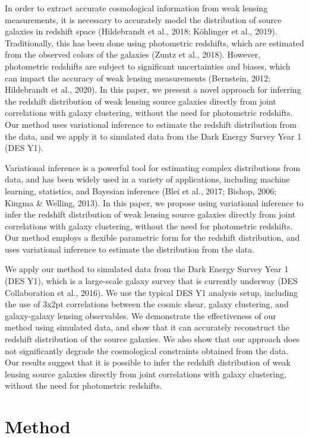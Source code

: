 \documentclass[twocolumn]{aastex631}
\begin{document}
In order to extract accurate cosmological information from weak lensing measurements, it is necessary to accurately model the distribution of source galaxies in redshift space (Hildebrandt et al., 2018; Köhlinger et al., 2019). Traditionally, this has been done using photometric redshifts, which are estimated from the observed colors of the galaxies (Zuntz et al., 2018). However, photometric redshifts are subject to significant uncertainties and biases, which can impact the accuracy of weak lensing measurements (Bernstein, 2012; Hildebrandt et al., 2020). In this paper, we present a novel approach for inferring the redshift distribution of weak lensing source galaxies directly from joint correlations with galaxy clustering, without the need for photometric redshifts. Our method uses variational inference to estimate the redshift distribution from the data, and we apply it to simulated data from the Dark Energy Survey Year 1 (DES Y1).

Variational inference is a powerful tool for estimating complex distributions from data, and has been widely used in a variety of applications, including machine learning, statistics, and Bayesian inference (Blei et al., 2017; Bishop, 2006; Kingma \& Welling, 2013). In this paper, we propose using variational inference to infer the redshift distribution of weak lensing source galaxies directly from joint correlations with galaxy clustering, without the need for photometric redshifts. Our method employs a flexible parametric form for the redshift distribution, and uses variational inference to estimate the distribution from the data.

We apply our method to simulated data from the Dark Energy Survey Year 1 (DES Y1), which is a large-scale galaxy survey that is currently underway (DES Collaboration et al., 2016). We use the typical DES Y1 analysis setup, including the use of 3x2pt correlations between the cosmic shear, galaxy clustering, and galaxy-galaxy lensing observables. We demonstrate the effectiveness of our method using simulated data, and show that it can accurately reconstruct the redshift distribution of the source galaxies. We also show that our approach does not significantly degrade the cosmological constraints obtained from the data. Our results suggest that it is possible to infer the redshift distribution of weak lensing source galaxies directly from joint correlations with galaxy clustering, without the need for photometric redshifts.

\section{Method}
\end{document}
